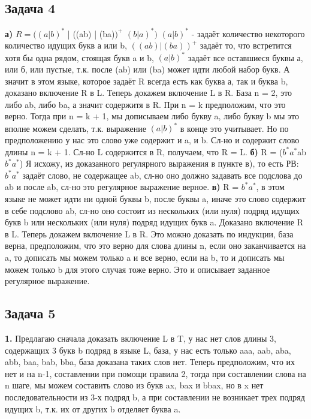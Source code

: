 \documentclass[a4paper,14pt]{article} %
\begin{document}
\subsection{Задача 4}
\textbf{а)} $R = ((a|b)^{*}$ | ((ab) | (ba)$)^{+}$ $(b|a)^{*})$
\newline
$(a|b)^{*}$ - задаёт количество некоторого количество идущих букв а или b,
\newline
$((ab) | (ba))^{+}$ задаёт то, что встретится хотя бы одна рядом, стоящая букв a и b,
$(a|b)^{*}$ задаёт все оставшиеся буквы а, или б, или пустые, т.к. после (ab) или (ba) может идти любой набор букв.
А значит в этом языке, которое задаёт R всегда есть как буква а, так и буква b, доказано включение R в L.
\newline
Теперь докажем включение L в R.
База n = 2, это либо ab, либо ba, а значит содержитя в R.
При n = k предположим, что это верно. Тогда при n = k + 1, мы дописываем либо букву a, либо букву b мы это вполне можем сделать, т.к. выражение $(a|b)^{*}$ в конце это учитывает.
Но по предположению у нас это слово уже содержит и a, и b. Сл-но и содержит слово длины n = k + 1. Сл-но L содержится в R, получаем, что R = L.
\newline
\textbf{б)} R = ($b^{*}a^{*}$ab$b^{*}a^{*}$) Я исхожу, из доказанного регулярного выражения в пункте в), то есть РВ: $b^{*}a^{*}$ задаёт слово, не содержащее ab, сл-но оно должно задавать все подслова до ab и после ab, сл-но это регулярное выражение верное.
\newline
\textbf{в)} R = $b^{*}a^{*}$, в этом языке не может идти ни одной буквы b, после буквы a, иначе это слово содержит в себе подслово ab, сл-но оно состоит из нескольких (или нуля) подряд идущих букв b или нескольких (или нуля) подряд идущих букв a. Доказано включение R в L.
Теперь докажем включение L в R. Это можно доказать по индукции, база верна, предположим, что это верно для слова длины n, если оно заканчивается на a, то дописать мы можем только a и все верно, если на b, то и дописать мы можем только b для этого случая тоже верно. 
Это и описывает заданное регулярное выражение.
\newline
\subsection{Задача 5}
\textbf{1.} Предлагаю сначала доказать включение L в T, у нас нет слов длины 3, содержащих 3 букв b подряд в языке L, база, у нас есть только  aaa, aab, aba, abb, baa, bab, bba, база доказана таких слов нет.
Теперь предположим, что их нет и на n-1, составлении при помощи правила 2, тогда при составлении слова на n шаге, мы можем составить слово из букв ax, bax и bbax, но в x нет последовательности 
из 3-х подряд b, а при составлении не возникает трех подряд идущих b, т.к. их от других b отделяет буква a. 
\end{document}
